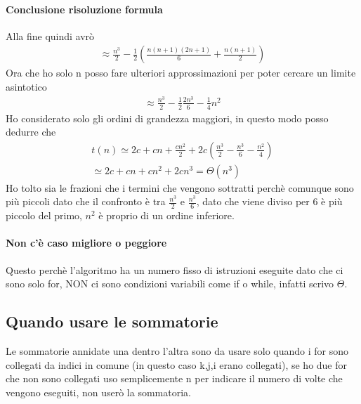 \paragraph*{Conclusione risoluzione formula} Alla fine quindi avrò
\begin{align*}
    \approx \frac{n^3}{2}-\frac{1}{2}(\frac{n(n+1)(2n+1)}{6}+ 
    \frac{n(n+1)}{2})
\end{align*}
Ora che ho solo n posso fare ulteriori approssimazioni per poter cercare un limite asintotico
\begin{align*}
    \approx \frac{n^3}{2} -\frac{1}{2}\frac{2n^3}{6}-\frac{1}{4}n^2
\end{align*}
Ho considerato solo gli ordini di grandezza maggiori, in questo modo posso dedurre che 
\begin{align*}
    t(n)\simeq 2c+cn+\frac{cn^2}{2} + 2c(\frac{n^3}{2}-\frac{n^3}{6}-\frac{n^2}{4})\\
    \simeq 2c+cn+cn^2+2cn^3 = \Theta(n^3)
\end{align*}
Ho tolto sia le frazioni che i termini che vengono sottratti perchè comunque sono più piccoli dato
che il confronto è tra $\frac{n^3}{2}$ e $\frac{n^3}{6}$, dato che viene diviso per 6 è più piccolo
del primo, $n^2$ è proprio di un ordine inferiore.\\
\paragraph*{Non c'è caso migliore o peggiore} Questo perchè l'algoritmo ha un numero fisso di
istruzioni eseguite dato che ci sono solo for, NON ci sono condizioni variabili come if o while, infatti
scrivo $\Theta$.
\subsection{Quando usare le sommatorie}
Le sommatorie annidate una dentro l'altra sono da usare solo quando i for sono collegati da indici
in comune (in questo caso k,j,i erano collegati), se ho due for che non sono collegati uso semplicemente n per
indicare il numero di volte che vengono eseguiti, non userò la sommatoria.

